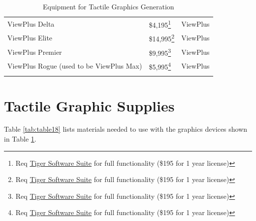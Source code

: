 \documentclass[12pt,letterpaper,twoside,openright]{report}
\begin{document}
\begin{longtable}[]{@{}
	>{\raggedright\arraybackslash}m{}
	>{\raggedright\arraybackslash}m{}
	>{\raggedright\arraybackslash}b{}@{}
	}
ViewPlus Delta                                      & \$4,195\footnote{\raggedright Req \href{http://viewplus.com/product/tiger-software-suite8/}{Tiger Software Suite} for full functionality (\$195 for 1 year license)}  & ViewPlus            \\[1.0em]
ViewPlus Elite                                      & \$14,995\footnote{\raggedright Req \href{http://viewplus.com/product/tiger-software-suite8/}{Tiger Software Suite} for full functionality (\$195 for 1 year license)} & ViewPlus            \\[1.0em]
ViewPlus Premier                                    & \$9,995\footnote{\raggedright Req \href{http://viewplus.com/product/tiger-software-suite8/}{Tiger Software Suite} for full functionality (\$195 for 1 year license)}  & ViewPlus            \\[1.0em]
ViewPlus Rogue \break (used to be ViewPlus Max)     & \$5,995\footnote{\raggedright Req \href{http://viewplus.com/product/tiger-software-suite8/}{Tiger Software Suite} for full functionality (\$195 for 1 year license)}  & ViewPlus            \\[1.0em]\hline
	\caption{ Equipment for Tactile Graphics Generation}\label{tab:table17}
\end{longtable}

\pagebreak
\hypertarget{tactile-paper}{}\section{Tactile Graphic Supplies}\label{tactile-paper}
Table \ref{tab:table18} lists materials needed to use with the graphics devices shown in Table \ref{tab:table17}.
\end{document}
